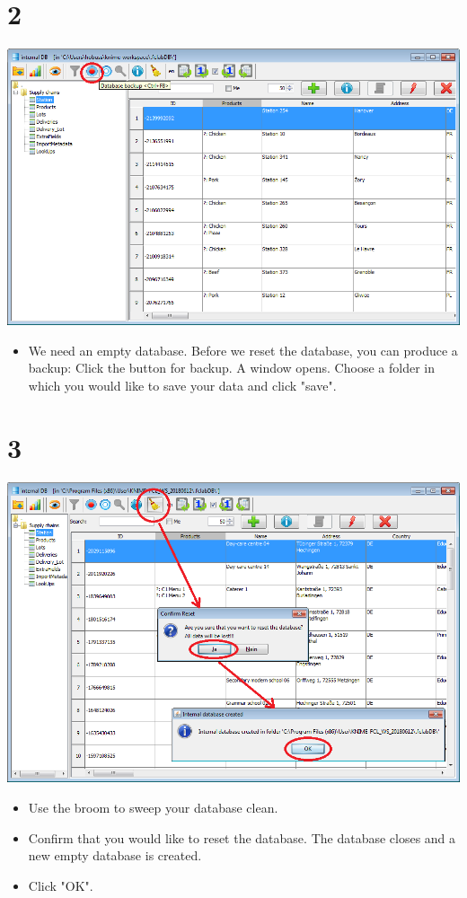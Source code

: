 \documentclass[10pt]{beamer}
\begin{document}
\section{2}
\begin{frame}
	\begin{center}
			\includegraphics[height=0.6\textheight]{2.png}
	\end{center}
	\begin{itemize}
		\item We need an empty database. Before we reset the database, you can produce a backup: Click the button for backup. A window opens. Choose a folder in which you would like to save your data and click "save".
	\end{itemize}
\end{frame}

\section{3}
\begin{frame}
	\begin{center}
			\includegraphics[height=0.6\textheight]{3.png}
	\end{center}
	\begin{itemize}
		\item Use the broom to sweep your database clean.
		\item Confirm that you would like to reset the database. The database closes and a new empty database is created.
		\item Click "OK".
	\end{itemize}
\end{frame}
\end{document}
